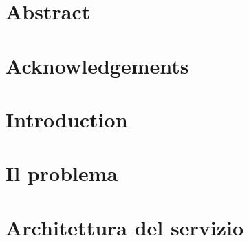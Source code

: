 





\cleardoublepage


\cleardoublepage

\chapter*{Abstract}{}
\thispagestyle{empty}
\cleardoublepage

\chapter*{Acknowledgements}{}
\thispagestyle{empty}
\cleardoublepage

\newpage
\setcounter{page}{1}
\pagestyle{headings}

\renewcommand{\contentsname}{Table of Contents}
\tableofcontents
\listoffigures
\listoftables
\cleardoublepage

\newpage
\setcounter{page}{1}

\chapter*{Introduction}
{}

\chapter{Il problema}\label{chapter:introduzione_al_problema}


\chapter{Architettura del servizio}\label{chapter:architettura}


